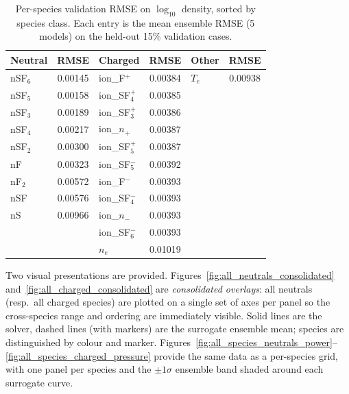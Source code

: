 \documentclass[12pt,a4paper]{article}
\begin{document}
\begin{table}[H]
  \centering
  \caption{Per-species validation RMSE on $\log_{10}$ density, sorted
           by species class.  Each entry is the mean ensemble RMSE
           (5 models) on the held-out 15\% validation cases.}
  \label{tab:all_species_rmse}
  \small
  \begin{tabular}{lc|lc|lc}
    \toprule
    Neutral & RMSE & Charged & RMSE & Other & RMSE \\
    \midrule
    nSF$_6$ & 0.00145 & ion\_F$^{+}$    & 0.00384 & $T_e$ & 0.00938 \\
    nSF$_5$ & 0.00158 & ion\_SF$_4^{+}$ & 0.00385 &       &         \\
    nSF$_3$ & 0.00189 & ion\_SF$_3^{+}$ & 0.00386 &       &         \\
    nSF$_4$ & 0.00217 & ion\_$n_{+}$    & 0.00387 &       &         \\
    nSF$_2$ & 0.00300 & ion\_SF$_5^{+}$ & 0.00387 &       &         \\
    nF      & 0.00323 & ion\_SF$_5^{-}$ & 0.00392 &       &         \\
    nF$_2$  & 0.00572 & ion\_F$^{-}$    & 0.00393 &       &         \\
    nSF     & 0.00576 & ion\_SF$_4^{-}$ & 0.00393 &       &         \\
    nS      & 0.00966 & ion\_$n_{-}$    & 0.00393 &       &         \\
            &         & ion\_SF$_6^{-}$ & 0.00393 &       &         \\
            &         & $n_e$           & 0.01019 &       &         \\
    \bottomrule
  \end{tabular}
\end{table}

Two visual presentations are provided.  Figures~\ref{fig:all_neutrals_consolidated}
and~\ref{fig:all_charged_consolidated} are \emph{consolidated overlays}:
all neutrals (resp.\ all charged species) are plotted on a single set
of axes per panel so the cross-species range and ordering are
immediately visible.  Solid lines are the solver, dashed lines (with
markers) are the surrogate ensemble mean; species are distinguished by
colour and marker.  Figures~\ref{fig:all_species_neutrals_power}--%
\ref{fig:all_species_charged_pressure} provide the same data as a
per-species grid, with one panel per species and the $\pm 1\sigma$
ensemble band shaded around each surrogate curve.
\end{document}
